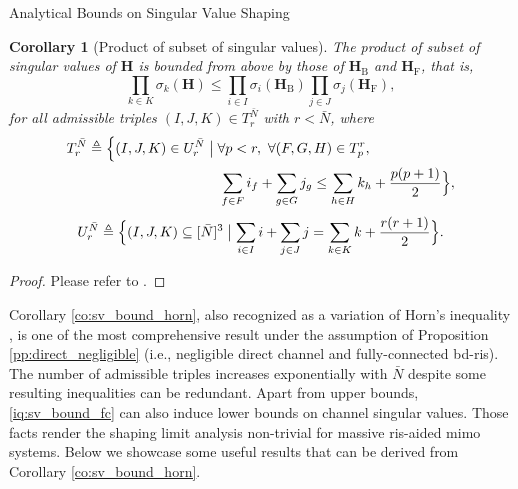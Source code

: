 \documentclass[journal]{IEEEtran}
\newtheorem{corollary}{Corollary}[proposition]
\begin{document}
\begin{section}{Analytical Bounds on Singular Value Shaping}
		\begin{corollary}[Product of subset of singular values\label{co:sv_bound_horn}]
			The product of subset of singular values of $\mathbf{H}$ is bounded from above by those of $\mathbf{H}_\mathrm{B}$ and $\mathbf{H}_\mathrm{F}$, that is,
			\begin{equation}
				\prod_{k \in {K}} \sigma_k(\mathbf{H}) \le \prod_{i \in {I}} \sigma_i(\mathbf{H}_\mathrm{B}) \prod_{j \in {J}} \sigma_j(\mathbf{H}_\mathrm{F}),
				\label{iq:sv_bound_fc}
			\end{equation}
			for all admissible triples $(I, J, K) \in T_r^{\bar{N}}$ with $r < \bar{N}$, where
			\begin{equation*}
				\begin{split}
					T_r^{\bar{N}} \triangleq \Bigl\{(I, J, K) \in U_r^{\bar{N}} & \bigm\vert \forall p < r, \ \forall (F, G, H) \in T_p^r,\\
					& \quad \sum_{f \in F} i_f + \sum_{g \in G} j_g \le \sum_{h \in H} k_h + \frac{p(p+1)}{2} \Bigr\},
				\end{split}
			\end{equation*}
			\begin{equation*}
				U_r^{\bar{N}} \triangleq \Bigl\{(I, J, K) \subseteq [\bar{N}]^3 \bigm\vert \sum_{i \in I} i + \sum_{j \in J} j = \sum_{k \in K} k + \frac{r(r+1)}{2}\Bigr\}.
			\end{equation*}
		\end{corollary}

		\begin{proof}
			Please refer to \cite[Theorem~8]{Fulton2000}.
		\end{proof}

		Corollary \ref{co:sv_bound_horn}, also recognized as a variation of Horn's inequality \cite{Bhatia2001}, is one of the most comprehensive result under the assumption of Proposition \ref{pp:direct_negligible} (i.e., negligible direct channel and fully-connected \gls{bd}-\gls{ris}).
		The number of admissible triples increases exponentially with $\bar{N}$ despite some resulting inequalities can be redundant.
		Apart from upper bounds, \eqref{iq:sv_bound_fc} can also induce lower bounds on channel singular values.
		Those facts render the shaping limit analysis non-trivial for massive \gls{ris}-aided \gls{mimo} systems.
		Below we showcase some useful results that can be derived from Corollary \ref{co:sv_bound_horn}.


\end{section}
\end{document}
